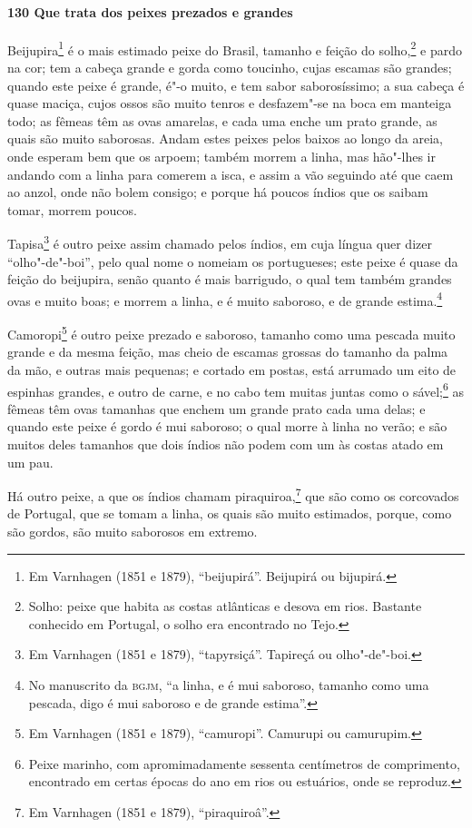\begin{linenumbers}
\paragraph{130 Que trata dos peixes prezados e grandes}\quad
Beijupira\footnote{ Em Varnhagen (1851 e 1879), ``beijupirá''. Beijupirá ou bijupirá.} é o
mais estimado peixe do Brasil, tamanho e feição do solho,\footnote{ Solho: peixe que habita
as costas atlânticas e desova em rios. Bastante conhecido em Portugal, o solho era
encontrado no Tejo.} e pardo na cor; tem a cabeça grande e gorda como toucinho, cujas
escamas são grandes; quando este peixe é grande, é"-o muito, e tem sabor saborosíssimo; a
sua cabeça é quase maciça, cujos ossos são muito tenros e desfazem"-se na boca em manteiga
todo; as fêmeas têm as ovas amarelas, e cada uma enche um prato grande, as quais são muito
saborosas. Andam estes peixes pelos baixos ao longo da areia, onde esperam bem que os
arpoem; também morrem a linha, mas hão"-lhes ir andando com a linha para comerem a isca, e
assim a vão seguindo até que caem ao anzol, onde não bolem consigo; e porque há poucos
índios que os saibam tomar, morrem poucos.

Tapisa\footnote{ Em Varnhagen (1851 e 1879), ``tapyrsiçá''. Tapireçá ou olho"-de"-boi.} é
outro peixe assim chamado pelos índios, em cuja língua quer dizer ``olho"-de"-boi'', pelo
qual nome o nomeiam os portugueses; este peixe é quase da feição do beijupira, senão
quanto é mais barrigudo, o qual tem também grandes ovas e muito boas; e morrem a linha, e
é muito saboroso, e de grande estima.\footnote{ No manuscrito da \textsc{bgjm}, ``a linha,
e é mui saboroso, tamanho como uma pescada, digo é mui saboroso e de grande estima''.}

Camoropi\footnote{ Em Varnhagen (1851 e 1879), ``camuropi''. Camurupi ou camurupim.} é
outro peixe prezado e saboroso, tamanho como uma pescada muito grande e da mesma feição,
mas cheio de escamas grossas do tamanho da palma da mão, e outras mais pequenas; e cortado
em postas, está arrumado um eito de espinhas grandes, e outro de carne, e no cabo tem
muitas juntas como o sável;\footnote{ Peixe marinho, com apromimadamente sessenta centímetros de
comprimento, encontrado em certas épocas do ano em rios ou estuários, onde se reproduz.}
as fêmeas têm ovas tamanhas que enchem um grande prato cada uma delas; e quando este peixe
é gordo é mui saboroso; o qual morre à linha no verão; e são muitos deles tamanhos que
dois índios não podem com um às costas atado em um pau.

Há outro peixe, a que os índios chamam piraquiroa,\footnote{ Em Varnhagen (1851 e 1879),
``piraquiroâ''.} que são como os corcovados de Portugal, que se tomam a linha, os quais
são muito estimados, porque, como são gordos, são muito saborosos em extremo.


\end{linenumbers}
